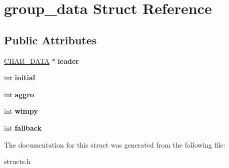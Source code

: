 \hypertarget{structgroup__data}{\section{group\-\_\-data Struct Reference}
\label{structgroup__data}
}
\subsection*{Public Attributes}
\begin{DoxyCompactItemize}
\item 
\hypertarget{structgroup__data_a76ea922a03414d213839e88f557549a3}{\hyperlink{structchar__data}{C\-H\-A\-R\-\_\-\-D\-A\-T\-A} $\ast$ {\bfseries leader}}\label{structgroup__data_a76ea922a03414d213839e88f557549a3}

\item 
\hypertarget{structgroup__data_a43dac1515f8e79344686fd54792a40da}{int {\bfseries initial}}\label{structgroup__data_a43dac1515f8e79344686fd54792a40da}

\item 
\hypertarget{structgroup__data_aa98e119c7e8a340e9290d82e0823b936}{int {\bfseries aggro}}\label{structgroup__data_aa98e119c7e8a340e9290d82e0823b936}

\item 
\hypertarget{structgroup__data_ad6b7ee1c4c0f7b4967aa3f3b0af34d8f}{int {\bfseries wimpy}}\label{structgroup__data_ad6b7ee1c4c0f7b4967aa3f3b0af34d8f}

\item 
\hypertarget{structgroup__data_ac597af422bc24eea7b833c8f28b534be}{int {\bfseries fallback}}\label{structgroup__data_ac597af422bc24eea7b833c8f28b534be}

\end{DoxyCompactItemize}


The documentation for this struct was generated from the following file\-:\begin{DoxyCompactItemize}
\item 
structs.\-h\end{DoxyCompactItemize}
